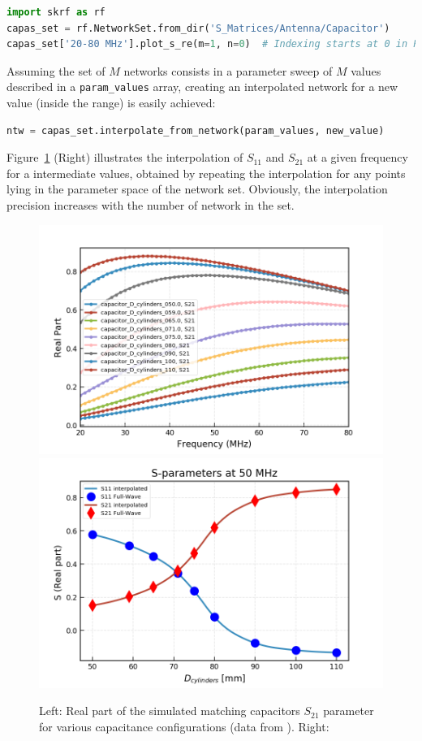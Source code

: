 \documentclass{aip-cp}
\begin{document}
\begin{lstlisting}[language=Python]
import skrf as rf
capas_set = rf.NetworkSet.from_dir('S_Matrices/Antenna/Capacitor')
capas_set['20-80 MHz'].plot_s_re(m=1, n=0)  # Indexing starts at 0 in Python
\end{lstlisting}

Assuming the set of $M$ networks consists in a parameter sweep of $M$ values described in a \texttt{param\_values}  array, creating an interpolated network for a new value (inside the range) is easily achieved:

\begin{lstlisting}[language=Python]
ntw = capas_set.interpolate_from_network(param_values, new_value)
\end{lstlisting}

Figure~\ref{fig:capassets21db} (Right) illustrates the interpolation of $S_{11}$ and $S_{21}$ at a given frequency for a intermediate values, obtained by repeating the interpolation for any points lying in the parameter space of the network set. Obviously, the interpolation precision increases with the number of network in the set.

\begin{figure}[h]
	\centering
	\includegraphics[width=0.49\linewidth]{figures/capas_set_S21db}
	\includegraphics[width=0.49\linewidth]{figures/S11_S21_interpolated}
	\caption{Left: Real part of the simulated matching capacitors $S_{21}$ parameter for various capacitance configurations (data from \cite{Helou2016}). Right: }
	\label{fig:capassets21db}
\end{figure}
\end{document}
